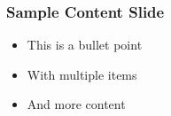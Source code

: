 \begin{frame}
\frametitle{Sample Content Slide}
\begin{itemize}
    \item This is a bullet point
    \item With multiple items
    \item And more content
\end{itemize}
\end{frame}